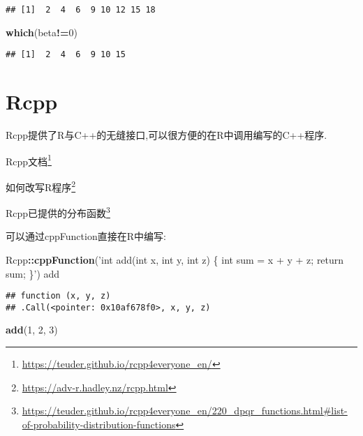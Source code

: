 \documentclass[]{ctexbook}
\newenvironment{Shaded}{\begin{snugshade}}{\end{snugshade}}
\newcommand{\DecValTok}[1]{\textcolor[rgb]{0.00,0.00,0.81}{#1}}
\newcommand{\KeywordTok}[1]{\textcolor[rgb]{0.13,0.29,0.53}{\textbf{#1}}}
\newcommand{\NormalTok}[1]{#1}
\newcommand{\OperatorTok}[1]{\textcolor[rgb]{0.81,0.36,0.00}{\textbf{#1}}}
\newcommand{\StringTok}[1]{\textcolor[rgb]{0.31,0.60,0.02}{#1}}
\renewcommand{\href}[2]{#2\footnote{\url{#1}}}
\begin{document}
\begin{verbatim}
## [1]  2  4  6  9 10 12 15 18
\end{verbatim}

\begin{Shaded}
\begin{Highlighting}[]
\KeywordTok{which}\NormalTok{(beta}\OperatorTok{!=}\DecValTok{0}\NormalTok{)}
\end{Highlighting}
\end{Shaded}

\begin{verbatim}
## [1]  2  4  6  9 10 15
\end{verbatim}

\hypertarget{rcpp}{%
\section{Rcpp}\label{rcpp}}

Rcpp提供了R与C++的无缝接口,可以很方便的在R中调用编写的C++程序.

\href{https://teuder.github.io/rcpp4everyone_en/}{Rcpp文档}

\href{https://adv-r.hadley.nz/rcpp.html}{如何改写R程序}

\href{https://teuder.github.io/rcpp4everyone_en/220_dpqr_functions.html\#list-of-probability-distribution-functions}{Rcpp已提供的分布函数}

可以通过cppFunction直接在R中编写:

\begin{Shaded}
\begin{Highlighting}[]
\NormalTok{Rcpp}\OperatorTok{::}\KeywordTok{cppFunction}\NormalTok{(}\StringTok{'int add(int x, int y, int z) \{}
\StringTok{  int sum = x + y + z;}
\StringTok{  return sum;}
\StringTok{\}'}\NormalTok{)}
\NormalTok{add}
\end{Highlighting}
\end{Shaded}

\begin{verbatim}
## function (x, y, z) 
## .Call(<pointer: 0x10af678f0>, x, y, z)
\end{verbatim}

\begin{Shaded}
\begin{Highlighting}[]
\KeywordTok{add}\NormalTok{(}\DecValTok{1}\NormalTok{, }\DecValTok{2}\NormalTok{, }\DecValTok{3}\NormalTok{)}
\end{Highlighting}
\end{Shaded}
\end{document}
